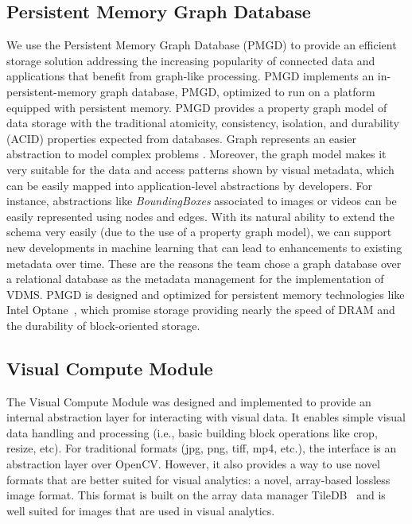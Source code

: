 \subsection{Persistent Memory Graph Database}

We use the Persistent Memory Graph Database (PMGD) to provide an efficient storage
solution addressing the increasing popularity of connected data and
applications that benefit from graph-like processing.
PMGD implements an in-persistent-memory graph database, PMGD, optimized
to run on a platform equipped with persistent memory.
PMGD provides a property graph model of data storage with the traditional
atomicity, consistency, isolation, and durability
(ACID) properties expected from databases.
Graph represents an easier abstraction to model complex problems \cite{tao}.
Moreover, the graph model makes it very suitable for the data and
access patterns shown by visual metadata, which can be easily mapped
into application-level abstractions by developers.
For instance, abstractions like \textit{BoundingBoxes} associated to
images or videos can be easily represented using nodes and edges.
With its natural ability to extend the schema very
easily (due to the use of a property graph model),
we can support new developments in machine learning that can lead to
enhancements to existing metadata over time.
These are the reasons the team chose a graph database over a
relational database as the metadata management for the implementation of VDMS.
PMGD is designed and optimized for persistent memory technologies
like Intel Optane~\cite{IntelXPoint15}, which
promise storage providing nearly the speed of DRAM and the
durability of block-oriented storage.

\subsection{Visual Compute Module}

The Visual Compute Module was designed and implemented to provide
an internal abstraction layer for interacting with visual data.
It enables simple visual data handling and processing (i.e., basic building block
operations like crop, resize, etc).
For traditional formats (jpg, png, tiff, mp4, etc.),
the interface is an abstraction layer over OpenCV.
However, it also provides a way to use novel formats that are
better suited for visual analytics: a novel, array-based lossless image format.
This format is built on the array data manager TileDB~\cite{TileDB} and
is well suited for images that are used in visual analytics.

